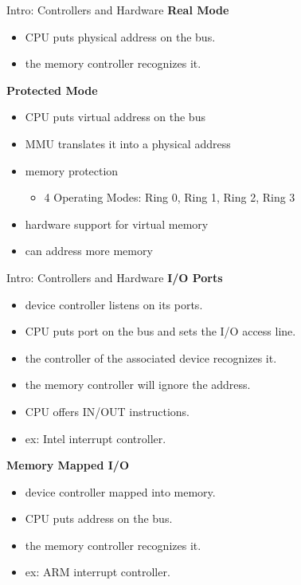 \documentclass{workshop}
\begin{document}
\begin{frame}{Intro: Controllers and Hardware}
\textbf{Real Mode}\\
\begin{itemize}
  \item CPU puts physical address on the bus.
  \item the memory controller recognizes it.
\end{itemize}

\textbf{Protected Mode}\\
\begin{itemize}
  \item CPU puts virtual address on the bus
  \item MMU translates it into a physical address
  \item memory protection
  \begin{itemize}
    \item 4 Operating Modes: Ring 0, Ring 1, Ring 2, Ring 3
  \end{itemize}
  \item hardware support for virtual memory
  \item can address more memory
\end{itemize}
\end{frame}

\begin{frame}{Intro: Controllers and Hardware}
\textbf{I/O Ports}\\
\begin{itemize}
  \item device controller listens on its ports.
  \item CPU puts port on the bus and sets the I/O access line.
  \item the controller of the associated device recognizes it.
  \item the memory controller will ignore the address.
  \item CPU offers IN/OUT instructions.
  \item ex: Intel interrupt controller.
\end{itemize}

\textbf{Memory Mapped I/O}\\
\begin{itemize}
  \item device controller mapped into memory.
  \item CPU puts address on the bus.
  \item the memory controller recognizes it.
  \item ex: ARM interrupt controller.
\end{itemize}
\end{frame}
\end{document}
